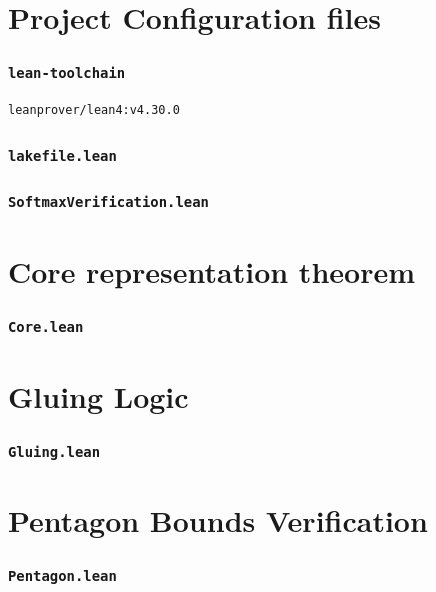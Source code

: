 \documentclass{article}
\begin{document}
\tableofcontents

\newpage
\section{Project Configuration files}

\subsubsection*{\texttt{lean-toolchain}}
\begin{lstlisting}[language=lean, numbers=none]
leanprover/lean4:v4.30.0
\end{lstlisting}

\subsubsection*{\texttt{lakefile.lean}}


\subsubsection*{\texttt{SoftmaxVerification.lean}}



\newpage
\section{Core representation theorem}
\label{app:lean-core}
\subsubsection*{\texttt{Core.lean}}



\newpage
\section{Gluing Logic}
\label{app:lean-gluing}
\subsubsection*{\texttt{Gluing.lean}}



\newpage
\section{Pentagon Bounds Verification}
\label{app:lean-pentagon}
\subsubsection*{\texttt{Pentagon.lean}}

\end{document}
